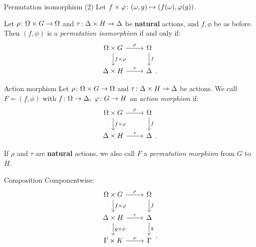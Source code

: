 \documentclass{beamer}
\theoremstyle{plain}
\theoremstyle{definition}
\begin{document}
\begin{frame}{Permutation isomorphism (2)}
Let
$f \times \varphi \colon (\omega, g) \mapsto (f(\omega), \varphi(g))$.

\pause
Let $\rho \colon \Omega \times G \rightarrow \Omega$ and
$\tau \colon \Delta \times H \rightarrow \Delta$ be \textbf{natural} actions,
and
$f, \phi$ be as before.
\pause
Then $(f, \phi)$ is a \emph{permutation isomorphism}
if and only if:
\vspace{1em}
\[
\begin{tikzcd}[ampersand replacement=\&]
    \Omega \times G
        \ar[r, "\rho"]
        \ar[d, "f \times \varphi"]
    \&
    \Omega
        \ar[d, "f"]
    \\
    \Delta \times H
        \ar[r, "\tau"]
    \&
    \Delta
\end{tikzcd}
\raisebox{-2em}{.}
\]
\end{frame}

\begin{frame}{Action morphism}
Let $\rho \colon \Omega \times G \rightarrow \Omega$ and
$\tau \colon \Delta \times H \rightarrow \Delta$ be actions.
We call $F = (f, \phi)$ with
$f \colon \Omega \rightarrow \Delta,~ \varphi \colon G \rightarrow H$
an \emph{action morphism}
if:
\vspace{1em}
\[
\begin{tikzcd}[ampersand replacement=\&]
    \Omega \times G
        \ar[r, "\rho"]
        \ar[d, "f \times \varphi"]
    \&
    \Omega
        \ar[d, "f"]
    \\
    \Delta \times H
        \ar[r, "\tau"]
    \&
    \Delta
\end{tikzcd}
\raisebox{-2em}{.}
\]

\pause
If $\rho$ and $\tau$ are \textbf{natural} actions, we also call $F$ a
\emph{permutation morphism} from $G$ to $H$.
\end{frame}

\begin{frame}{Composition}
Componentwise:
\[
\begin{tikzcd}[ampersand replacement=\&]
    \Omega \times G
        \ar[r, "\rho"]
        \ar[d, "f \times \varphi"]
    \&
    \Omega
        \ar[d, "f"]
    \\
    \Delta \times H
        \ar[r, "\tau"]
        \ar[d, "g \times \psi"]
    \&
    \Delta
        \ar[d, "g"]
    \\
    \Gamma \times K
        \ar[r, "\nu"]
    \&
    \Gamma
\end{tikzcd}
\raisebox{-3em}{.}
\]
\end{frame}
\end{document}
